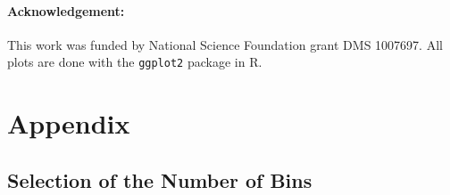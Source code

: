 \documentclass[12]{article}
\begin{document}
%
%

\paragraph{Acknowledgement:}

This work was funded by National Science Foundation grant DMS 1007697. All plots are done with the {\tt ggplot2} \citep{hadley:2009} package in R.


%

%


\section*{Appendix}

\subsection*{Selection of the Number of Bins} \label{sec:nbin}
\end{document}
